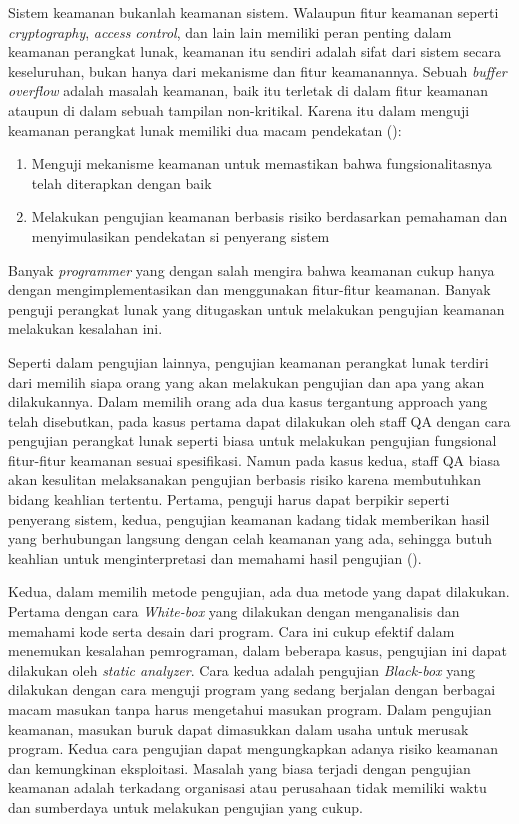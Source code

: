 Sistem keamanan bukanlah keamanan sistem. Walaupun fitur keamanan seperti \emph{cryptography},
\emph{access control}, dan lain lain memiliki peran penting dalam keamanan perangkat lunak,
keamanan itu sendiri adalah sifat dari sistem secara keseluruhan, bukan hanya dari mekanisme
dan fitur keamanannya. Sebuah \emph{buffer overflow} adalah masalah keamanan, baik itu terletak di dalam
fitur keamanan ataupun di dalam sebuah tampilan non-kritikal.
Karena itu dalam menguji keamanan perangkat lunak memiliki dua macam pendekatan (\cite{grawsec}):

\begin{enumerate}
    \item Menguji mekanisme keamanan untuk memastikan bahwa fungsionalitasnya telah diterapkan dengan baik
    \item Melakukan pengujian keamanan berbasis risiko berdasarkan pemahaman dan menyimulasikan pendekatan si penyerang sistem
\end{enumerate}

Banyak \emph{programmer} yang dengan salah mengira bahwa keamanan cukup hanya dengan mengimplementasikan dan
menggunakan fitur-fitur keamanan. Banyak penguji perangkat lunak yang ditugaskan untuk melakukan
pengujian keamanan melakukan kesalahan ini.

Seperti dalam pengujian lainnya, pengujian keamanan perangkat lunak terdiri dari memilih
siapa orang yang akan melakukan pengujian dan apa yang akan dilakukannya.
Dalam memilih orang ada dua kasus tergantung approach yang telah disebutkan,
pada kasus pertama dapat dilakukan oleh staff QA dengan cara pengujian
perangkat lunak seperti biasa untuk melakukan pengujian fungsional
fitur-fitur keamanan sesuai spesifikasi.
Namun pada kasus kedua, staff QA biasa akan kesulitan melaksanakan pengujian berbasis risiko
karena membutuhkan bidang keahlian tertentu.
Pertama, penguji harus dapat berpikir seperti penyerang sistem,
kedua, pengujian keamanan kadang tidak memberikan hasil yang berhubungan langsung dengan
celah keamanan yang ada, sehingga butuh keahlian untuk
menginterpretasi dan memahami hasil pengujian (\cite{grawsectest}).

Kedua, dalam memilih metode pengujian, ada dua metode yang dapat dilakukan.
Pertama dengan cara \emph{White-box} yang dilakukan dengan menganalisis dan memahami
kode serta desain dari program.
Cara ini cukup efektif dalam menemukan kesalahan pemrograman,
dalam beberapa kasus, pengujian ini dapat dilakukan oleh \emph{static analyzer}.
Cara kedua adalah pengujian \emph{Black-box} yang dilakukan dengan cara menguji program
yang sedang berjalan dengan berbagai macam masukan tanpa harus mengetahui masukan program.
Dalam pengujian keamanan, masukan buruk dapat dimasukkan dalam usaha untuk merusak program.
Kedua cara pengujian dapat mengungkapkan adanya risiko keamanan dan kemungkinan eksploitasi.
Masalah yang biasa terjadi dengan pengujian keamanan adalah terkadang organisasi atau perusahaan
tidak memiliki waktu dan sumberdaya untuk melakukan pengujian yang cukup.

